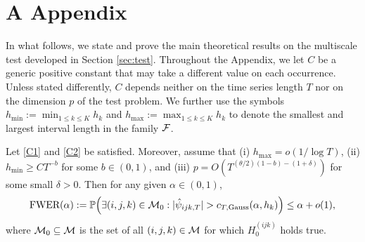 \documentclass[a4paper,12pt]{article}
\numberwithin{equation}{section}
\begin{document}
\FloatBarrier



\newpage
\section*{A \hspace{0.2cm} Appendix}
\def\theequation{A.\arabic{equation}}
\setcounter{equation}{0}

\enlargethispage{0.1cm}


In what follows, we state and prove the main theoretical results on the multiscale test developed in Section \ref{sec:test}. Throughout the Appendix, we let $C$ be a generic positive constant that may take a different value on each occurrence. Unless stated differently, $C$ depends neither on the time series length $T$ nor on the dimension $p$ of the test problem. We further use the symbols $h_{\min}:= \min_{1 \le k \le K} h_k$ and $h_{\max} := \max_{1 \le k \le K} h_k$ to denote the smallest and largest interval length in the family $\mathcal{F}$. 


\begin{theoremA}\label{theo1}
Let \ref{C1} and \ref{C2} be satisfied. Moreover, assume that (i) $h_{\max} = o(1/\log T)$, (ii) $h_{\min} \ge CT^{-b}$ for some $b \in (0,1)$, and (iii) $p = O(T^{(\theta/2)(1-b)-(1+\delta)})$ for some small $\delta > 0$. Then for any given $\alpha \in (0,1)$,
\[ \textnormal{FWER}(\alpha) := \mathbb{P} \Big( \exists (i,j,k) \in \mathcal{M}_0: |\hat{\psi}_{ijk,T}| > c_{T,\textnormal{Gauss}}(\alpha,h_k) \Big) \le \alpha + o(1), \]
where $\mathcal{M}_0 \subseteq \mathcal{M}$ is the set of all $(i,j,k) \in \mathcal{M}$ for which $H_0^{(ijk)}$ holds true. 
\end{theoremA}
\end{document}

